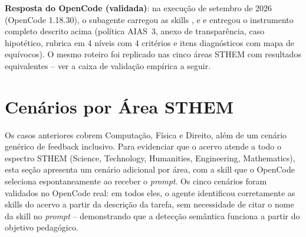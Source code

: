 \textbf{Resposta do OpenCode (validada)}: na execu{\c c}{\~a}o de setembro de 2026 (OpenCode 1.18.30), o subagente  carregou as skills ,  e  e entregou o instrumento completo descrito acima (pol{\'i}tica AIAS~3, anexo de transpar{\^e}ncia, caso hipot{\'e}tico, rubrica em 4 n{\'i}veis com 4 crit{\'e}rios e itens diagn{\'o}sticos com mapa de equ{\'i}vocos). O mesmo roteiro foi replicado nas cinco {\'a}reas STHEM com resultados equivalentes -- ver a caixa de valida{\c c}{\~a}o emp{\'i}rica a seguir.

\section{Cen{\'a}rios por {\'A}rea STHEM}

Os casos anteriores cobrem Computa{\c c}{\~a}o, F{\'i}sica e Direito, al{\'e}m de um cen{\'a}rio gen{\'e}rico de feedback inclusivo. Para evidenciar que o acervo atende a todo o espectro STHEM (Science, Technology, Humanities, Engineering, Mathematics), esta se{\c c}{\~a}o apresenta um cen{\'a}rio adicional por {\'a}rea, com a skill que o OpenCode seleciona espontaneamente ao receber o \emph{prompt}. Os cinco cen{\'a}rios foram validados no OpenCode real: em todos eles, o agente identificou corretamente as skills do acervo a partir da descri{\c c}{\~a}o da tarefa, sem necessidade de citar o nome da skill no \emph{prompt} -- demonstrando que a detec{\c c}{\~a}o sem{\^a}ntica funciona a partir do objetivo pedag{\'o}gico.

